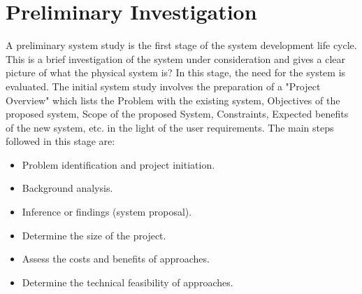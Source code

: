 \section{Preliminary Investigation}
		\vs
		\hspace{1cm} A preliminary system study is the first stage of the system development life cycle. This is a brief investigation of the system under consideration and gives a clear picture of what the physical system is? In this stage, the need for the system is evaluated. The initial system study involves the preparation of a "Project Overview" which lists the Problem with the existing system, Objectives of the proposed system, Scope of the proposed System, Constraints, Expected benefits of the new system, etc. in the light of the user requirements. The main steps followed in this stage are: 
		\begin{itemize}
			\item Problem identification and project initiation.
			\item Background analysis.
			\item Inference or findings (system proposal).
			\item Determine the size of the project.
			\item Assess the costs and benefits of approaches.
			\item Determine the technical feasibility of approaches.
		\end{itemize}